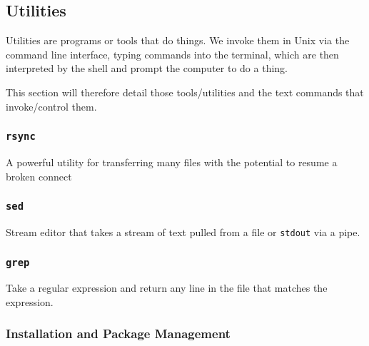 \documentclass[12pt]{article}
\theoremstyle{plain}
\theoremstyle{definition}
\theoremstyle{remark}
\begin{document}
\clearpage
\subsection{Utilities}

Utilities are programs or tools that do things.
We invoke them in Unix via the command line interface, typing commands
into the terminal, which are then interpreted by the shell and prompt
the computer to do a thing.

This section will therefore detail those tools/utilities and the text
commands that invoke/control them.

\subsubsection{\texttt{rsync}}

A powerful utility for transferring many files with the potential to
resume a broken connect

\subsubsection{\texttt{sed}}

Stream editor that takes a stream of text pulled from a file or
\texttt{stdout} via a pipe.


\subsubsection{\texttt{grep}}

Take a regular expression and return any line in the file that matches
the expression.


\subsubsection{Installation and Package Management}
\end{document}
